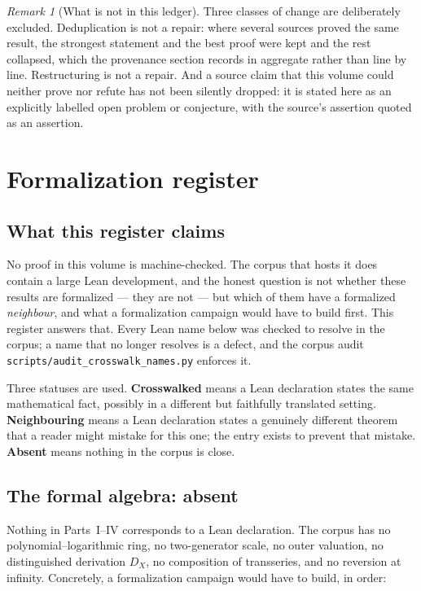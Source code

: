 \documentclass[11pt,oneside]{article}
\theoremstyle{plain}
\theoremstyle{definition}
\theoremstyle{remark}
\newtheorem{remark}[theorem]{Remark}
\newcommand{\DX}{D_{X}}                                  %
\begin{document}
\begin{remark}[What is not in this ledger]
\label{plt:rmk:repairs-scope}
Three classes of change are deliberately excluded.  Deduplication is not a
repair: where several sources proved the same result, the strongest statement
and the best proof were kept and the rest collapsed, which the provenance
section records in aggregate rather than line by line.  Restructuring is not a
repair.  And a source claim that this volume could neither prove nor refute has
not been silently dropped: it is stated here as an explicitly labelled open
problem or conjecture, with the source's assertion quoted as an assertion.
\end{remark}

\section{Formalization register}
\label{plt:sec:formalization}

\subsection{What this register claims}

No proof in this volume is machine-checked.  The corpus that hosts it does
contain a large Lean development, and the honest question is not whether these
results are formalized --- they are not --- but which of them have a formalized
\emph{neighbour}, and what a formalization campaign would have to build first.
This register answers that.  Every Lean name below was checked to resolve in
the corpus; a name that no longer resolves is a defect, and the corpus audit
\texttt{scripts/audit\_crosswalk\_names.py} enforces it.

Three statuses are used.  \textbf{Crosswalked} means a Lean declaration states
the same mathematical fact, possibly in a different but faithfully translated
setting.  \textbf{Neighbouring} means a Lean declaration states a genuinely
different theorem that a reader might mistake for this one; the entry exists to
prevent that mistake.  \textbf{Absent} means nothing in the corpus is close.

\subsection{The formal algebra: absent}

Nothing in Parts~I--IV corresponds to a Lean declaration.  The corpus has no
polynomial--logarithmic ring, no two-generator scale, no outer valuation, no
distinguished derivation \(\DX\), no composition of transseries, and no
reversion at infinity.  Concretely, a formalization campaign would have to
build, in order:
\end{document}
